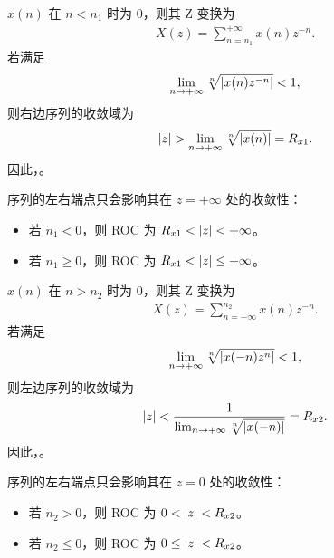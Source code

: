 \begin{property}
     $x(n)$ 在 $n < n_1$ 时为 $0$，则其 Z 变换为
    \begin{align*}
        X(z) = \sum_{n=n_1}^{+\infty} x(n) z^{-n}.
    \end{align*}
    若满足
    \begin{align*}
        \lim_{n \to +\infty}\sqrt[n]{\left|x(n)z^{-n}\right|} < 1,
    \end{align*}
    则右边序列的收敛域为
    \begin{align*}
        \left|z\right| > \lim_{n \to +\infty}\sqrt[n]{\left|x(n)\right|} = R_{x1}.
    \end{align*}
    因此，。

    序列的左右端点只会影响其在 $z = +\infty$ 处的收敛性：
    \begin{itemize}
        \item 若 $n_1 < 0$，则 ROC 为 $R_{x1} < \left|z\right| < +\infty$。
        \item 若 $n_1 \ge 0$，则 ROC 为 $R_{x1} < \left|z\right| \le +\infty$。
    \end{itemize}
\end{property}

\begin{property}
     $x(n)$ 在 $n > n_2$ 时为 $0$，则其 Z 变换为
    \begin{align*}
        X(z) = \sum_{n=-\infty}^{n_2} x(n) z^{-n}.
    \end{align*}
    若满足
    \begin{align*}
        \lim_{n \to +\infty}\sqrt[n]{\left|x(-n)z^n\right|} < 1,
    \end{align*}
    则左边序列的收敛域为
    \begin{align*}
        \left|z\right| < \frac{1}{\lim_{n \to +\infty}\sqrt[n]{\left|x(-n)\right|}} = R_{x2}.
    \end{align*}
    因此，。

    序列的左右端点只会影响其在 $z = 0$ 处的收敛性：
    \begin{itemize}
        \item 若 $n_2 > 0$，则 ROC 为 $0 < \left|z\right| < R_{x2}$。
        \item 若 $n_2 \le 0$，则 ROC 为 $0 \le \left|z\right| < R_{x2}$。
    \end{itemize}
\end{property}

